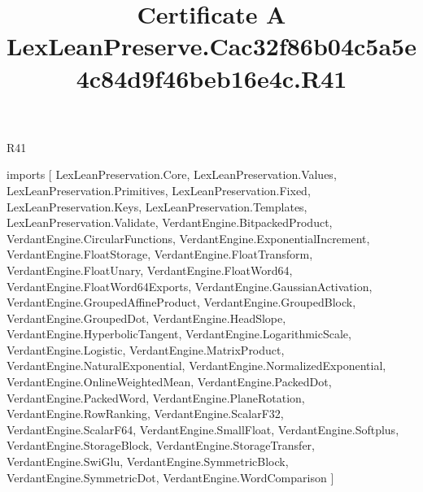\begin{lexlean}{R41}
\title{Certificate A LexLeanPreserve.Cac32f86b04c5a5e4c84d9f46beb16e4c.R41}
\begin{coremodule}
imports [
  LexLeanPreservation.Core,
  LexLeanPreservation.Values,
  LexLeanPreservation.Primitives,
  LexLeanPreservation.Fixed,
  LexLeanPreservation.Keys,
  LexLeanPreservation.Templates,
  LexLeanPreservation.Validate,
  VerdantEngine.BitpackedProduct,
  VerdantEngine.CircularFunctions,
  VerdantEngine.ExponentialIncrement,
  VerdantEngine.FloatStorage,
  VerdantEngine.FloatTransform,
  VerdantEngine.FloatUnary,
  VerdantEngine.FloatWord64,
  VerdantEngine.FloatWord64Exports,
  VerdantEngine.GaussianActivation,
  VerdantEngine.GroupedAffineProduct,
  VerdantEngine.GroupedBlock,
  VerdantEngine.GroupedDot,
  VerdantEngine.HeadSlope,
  VerdantEngine.HyperbolicTangent,
  VerdantEngine.LogarithmicScale,
  VerdantEngine.Logistic,
  VerdantEngine.MatrixProduct,
  VerdantEngine.NaturalExponential,
  VerdantEngine.NormalizedExponential,
  VerdantEngine.OnlineWeightedMean,
  VerdantEngine.PackedDot,
  VerdantEngine.PackedWord,
  VerdantEngine.PlaneRotation,
  VerdantEngine.RowRanking,
  VerdantEngine.ScalarF32,
  VerdantEngine.ScalarF64,
  VerdantEngine.SmallFloat,
  VerdantEngine.Softplus,
  VerdantEngine.StorageBlock,
  VerdantEngine.StorageTransfer,
  VerdantEngine.SwiGlu,
  VerdantEngine.SymmetricBlock,
  VerdantEngine.SymmetricDot,
  VerdantEngine.WordComparison
]


\end{coremodule}
\end{lexlean}
